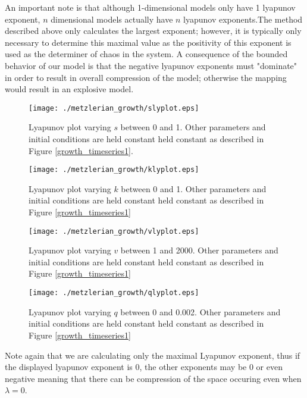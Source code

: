 An important note is that although 1-dimensional models only have 1 lyapunov exponent, $n$ dimensional models actually have $n$ lyapunov exponents.The method described above only calculates the largest exponent; however, it is typically only necessary to determine this maximal value as the positivity of this exponent is used as the determiner of chaos in the system. A consequence of the bounded behavior of our model is that the negative lyapunov exponents must "dominate" in order to result in overall compression of the model; otherwise the mapping would result in an explosive model. 

\begin{figure}
    \centering
    \texttt{[image: ./metzlerian\_growth/slyplot.eps]}
    \caption{Lyapunov plot varying $s$ between 0 and 1. Other parameters and initial conditions are held constant held constant as described in Figure \ref{growth_timeseries1}.}
    \label{slyapunov}
\end{figure}
\begin{figure}
    \centering
    \texttt{[image: ./metzlerian\_growth/klyplot.eps]}
    \caption{Lyapunov plot varying $k$ between 0 and 1. Other parameters and initial conditions are held constant held constant as described in Figure \ref{growth_timeseries1}}
    \label{klyapunov}
\end{figure}
\begin{figure}
    \centering
    \texttt{[image: ./metzlerian\_growth/vlyplot.eps]}
    \caption{Lyapunov plot varying $v$ between 1 and 2000. Other parameters and initial conditions are held constant held constant as described in Figure \ref{growth_timeseries1}}
    \label{klyapunov}
\end{figure}
\begin{figure}
    \centering
    \texttt{[image: ./metzlerian\_growth/qlyplot.eps]}
    \caption{Lyapunov plot varying $q$ between 0 and 0.002. Other parameters and initial conditions are held constant held constant as described in Figure \ref{growth_timeseries1}}
    \label{klyapunov}
\end{figure}

Note again that we are calculating only the maximal Lyapunov exponent, thus if the displayed lyapunov exponent is 0, the other exponents may be 0 or even negative meaning that there can be compression of the space occuring even when $\lambda=0$. 










